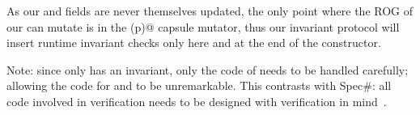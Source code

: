 As our \Q@path@ and \Q@h@ fields are never themselves updated, the only point where the ROG of our \Q@Cage@ can mutate is in the \Q@moveTo(p)@ capsule mutator, thus 
our invariant protocol will insert runtime invariant checks only here and at the end of the constructor.

\begin{comment}
We use the \Q@read@ annotation on the \Q@equals(that)@ method to express that it does not modify either its
receiver or its parameter. In \Q@Cage@ we use 
the \Q@capsule@ annotation to ensure
that the modification of the \Q@Hamster@'s ROG is fully under the control
of the containing \Q@Cage@. 
We annotated the \Q@move()@
and \Q@moveTo(p)@ methods with \Q@mut@, since they modify
their receivers' ROG. The default annotation is \Q@imm@, thus \Q@Cage@'s \Q@path@ field is a deeply immutable list of \Q@Point@s.
Our system performs runtime checks for the invariant
at the end of \Q@Cage@'s constructor, \Q@moveTo(p)@ method, and after any update to one of its fields.
The \Q@moveTo(p)@ method is the only one that may (directly) break the \Q@Cage@'s invariant. However, there is only a single occurrence of \Q@this@ and it is used to read the \Q@h@ field. We use the guarantees of RCs to ensure that no alias to \Q@this@ could be reachable from either \Q@h@ or the immutable \Q@Point@ parameter. Thus, the potentially broken \Q@this@ object is not visible while the \Q@Hamster@'s position is updated. 
The invariant is checked at the end of the \Q@moveTo(p)@ method, just before \Q@this@ would become visible again.
This technique loosely corresponds to an implicit pack and unpack: we `unpack' \Q@this@ before reading the field, then we work on the field's value while the invariant of \Q@this@ is not known to hold, finally when returning, we `pack' \Q!this! and check its invariant before allowing it to be used again.
\end{comment}

Note: since only \Q@Cage@ has an invariant,
 only the code of \Q@Cage@ needs to be handled carefully; allowing the code for \Q@Point@ and \Q@Hamster@ to be unremarkable.
 This contrasts with Spec\#: all code involved in  verification needs to be designed with verification in mind~\cite{barnett2011specification}.

